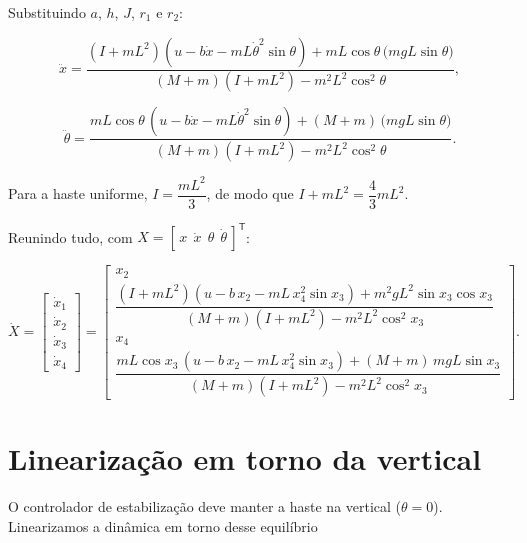 \documentclass[brazil, 12pt]{article}
\begin{document}
Substituindo $a$, $h$, $J$, $r_1$ e $r_2$:

\[
\ddot{x} =
\frac{
\left(I+mL^{2}\right)\!\left(u - b\dot{x} - mL\dot{\theta}^{2}\sin\theta\right)
+ mL\cos\theta\,\big(mgL\sin\theta\big)
}{
(M+m)\left(I+mL^{2}\right) - m^{2}L^{2}\cos^{2}\theta
},
\]

\[
\ddot{\theta} =
\frac{
mL\cos\theta\,\!\left(u - b\dot{x} - mL\dot{\theta}^{2}\sin\theta\right)
+ (M+m)\,\big(mgL\sin\theta\big)
}{
(M+m)\left(I+mL^{2}\right) - m^{2}L^{2}\cos^{2}\theta
}.
\]

Para a haste uniforme, $I=\dfrac{mL^{2}}{3}$, de modo que $I+mL^{2}=\dfrac{4}{3}mL^{2}$.


Reunindo tudo, com $X=[\,x\ \ \dot{x}\ \ \theta\ \ \dot{\theta}\,]^{\mathsf T}$:

\[
\dot{X} =
\begin{bmatrix}
\dot{x}_1 \\[4pt] \dot{x}_2 \\[4pt] \dot{x}_3 \\[4pt] \dot{x}_4
\end{bmatrix}
=
\begin{bmatrix}
x_2 \\[6pt]
\dfrac{
\left(I+mL^{2}\right)\!\left(u - b\,x_2 - mL\,x_4^{2}\sin x_3\right)
+ m^{2}gL^{2}\sin x_3\cos x_3
}{
(M+m)\left(I+mL^{2}\right) - m^{2}L^{2}\cos^{2} x_3
} \\[16pt]
x_4 \\[6pt]
\dfrac{
mL\cos x_3\,\!\left(u - b\,x_2 - mL\,x_4^{2}\sin x_3\right)
+ (M+m)\,mgL\sin x_3
}{
(M+m)\left(I+mL^{2}\right) - m^{2}L^{2}\cos^{2} x_3
}
\end{bmatrix}.
\]

\vspace{0.3cm}

\section{Linearização em torno da vertical}
\label{sec:linearizacao}

O controlador de estabilização deve manter a haste na vertical ($\theta = 0$).
Linearizamos a dinâmica em torno desse equilíbrio
\end{document}
